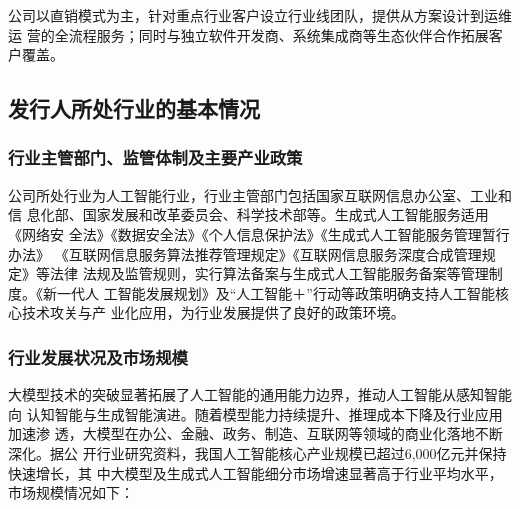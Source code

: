 公司以直销模式为主，针对重点行业客户设立行业线团队，提供从方案设计到运维运
营的全流程服务；同时与独立软件开发商、系统集成商等生态伙伴合作拓展客户覆盖。

\subsection{发行人所处行业的基本情况}

\subsubsection{行业主管部门、监管体制及主要产业政策}

公司所处行业为人工智能行业，行业主管部门包括国家互联网信息办公室、工业和信
息化部、国家发展和改革委员会、科学技术部等。生成式人工智能服务适用《网络安
全法》《数据安全法》《个人信息保护法》《生成式人工智能服务管理暂行办法》
《互联网信息服务算法推荐管理规定》《互联网信息服务深度合成管理规定》等法律
法规及监管规则，实行算法备案与生成式人工智能服务备案等管理制度。《新一代人
工智能发展规划》及``人工智能＋''行动等政策明确支持人工智能核心技术攻关与产
业化应用，为行业发展提供了良好的政策环境。

\subsubsection{行业发展状况及市场规模}

大模型技术的突破显著拓展了人工智能的通用能力边界，推动人工智能从感知智能向
认知智能与生成智能演进。随着模型能力持续提升、推理成本下降及行业应用加速渗
透，大模型在办公、金融、政务、制造、互联网等领域的商业化落地不断深化。据公
开行业研究资料，我国人工智能核心产业规模已超过6,000亿元并保持快速增长，其
中大模型及生成式人工智能细分市场增速显著高于行业平均水平，市场规模情况如下：

